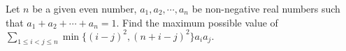 Let $n$ be a given even number, $a_1,a_2,\cdots,a_n$ be non-negative real numbers such that $a_1+a_2+\cdots+a_n=1.$ Find the maximum possible value of $\sum_{1\le i<j\le n}\min\{(i-j)^2,(n+i-j)^2\}a_ia_j .$